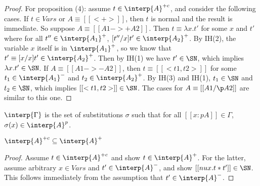 \begin{proof}
  For proposition (4): assume $t\in\interp{A}^{+c}$, and consider the
  following cases.  If $t\in\textit{Vars}$ or $A\equiv[[< + >]]$, then
  $t$ is normal and the result is immediate.  So suppose $A \equiv
  [[A1 ->+ A2]]$.  Then $t\equiv \lambda x.t'$ for some $x$ and $t'$
  where for all $t''\in\interp{A_1}^+$, $[t''/x]t'\in\interp{A_2}^+$.
  By IH(2), the variable $x$ itself is in $\interp{A_1}^+$, so
  we know that $t'\equiv[x/x]t'\in\interp{A_2}^+$.  Then by IH(1)
  we have $t'\in\SN$, which implies $\lambda x.t'\in\SN$.  If $A\equiv [[A1 ->- A2]]$,
  then $t\equiv [[< t1 , t2>]]$ for some $t_1\in\interp{A_1}^-$ and
  $t_2\in\interp{A_2}^+$.  By IH(3) and IH(1), $t_1\in\SN$ and $t_2\in\SN$,
  which implies $[[< t1 , t2 >]]\in\SN$.  The cases for $A \equiv [[A1 /\p A2]]$
  are similar to this one.
\end{proof}  

\begin{definition}
$\interp{\Gamma}$ is the set of substitutions $\sigma$ such that
for all $[[ x : p A]]\in\Gamma$, $\sigma(x)\in\interp{A}^p$.
\end{definition}

\begin{lemma}
\label{lem:canonpos}
$\interp{A}^{+c}\subseteq\interp{A}^+$
\end{lemma}
\begin{proof}
Assume $t\in\interp{A}^{+c}$ and show $t\in\interp{A}^+$.
For the latter, assume arbitrary $x\in\textit{Vars}$ and $t'\in\interp{A}^-$,
and show $[[nu x . t * t']]\in\SN$.  This follows immediately
from the assumption that $t'\in\interp{A}^-$.
\end{proof}

